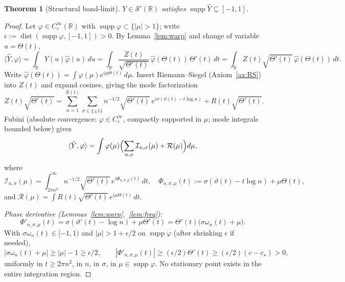 \documentclass[11pt]{article}
\newtheorem{theorem}{Theorem}
\theoremstyle{definition}
\newcommand{\R}{\mathbb{R}}
\newcommand{\supp}{\operatorname{supp}}
\begin{document}
\begin{theorem}[Structural band-limit]\label{thm:bandlimit}
\(Y\in\mathcal S'(\R)\) satisfies \(\supp\hat Y\subseteq[-1,1]\).
\end{theorem}

\begin{proof}
Let \(\varphi\in C_c^\infty(\R)\) with \(\supp\varphi\subset\{|\mu|>1\}\); write \(\epsilon:=\operatorname{dist}(\supp\varphi,[-1,1])>0\). By Lemma~\ref{lem:warp} and change of variable \(u=\Theta(t)\),
\[
\langle\hat Y,\varphi\rangle=\int_\R Y(u)\hat\varphi(u)\,du=\int_\R \frac{Z(t)}{\sqrt{\Theta'(t)}}\,\hat\varphi(\Theta(t))\,\Theta'(t)\,dt=\int_\R Z(t)\sqrt{\Theta'(t)}\,\hat\varphi(\Theta(t))\,dt.
\]
Write \(\hat\varphi(\Theta(t))=\int\varphi(\mu)e^{i\mu\Theta(t)}\,d\mu\). Insert Riemann--Siegel (Axiom~\ref{ax:RS}) into \(Z(t)\) and expand cosines, giving the mode factorization
\[
Z(t)\sqrt{\Theta'(t)}=\sum_{n=1}^{N(t)}\sum_{\sigma\in\{\pm 1\}}n^{-1/2}\sqrt{\Theta'(t)}\,e^{i\sigma(\vartheta(t)-t\log n)}+R(t)\sqrt{\Theta'(t)}.
\]
Fubini (absolute convergence: \(\varphi\in C_c^\infty\), compactly supported in \(\mu\); mode integrals bounded below) gives
\[
\langle\hat Y,\varphi\rangle=\int\varphi(\mu)\Bigl(\sum_{n,\sigma}\mathcal I_{n,\sigma}(\mu)+\mathcal R(\mu)\Bigr)d\mu,
\]
where
\[
\mathcal I_{n,\sigma}(\mu)=\int_{2\pi n^2}^\infty n^{-1/2}\sqrt{\Theta'(t)}\,e^{i\Phi_{n,\sigma,\mu}(t)}\,dt,\quad \Phi_{n,\sigma,\mu}(t):=\sigma(\vartheta(t)-t\log n)+\mu\Theta(t),
\]
and \(\mathcal R(\mu)=\int R(t)\sqrt{\Theta'(t)}\,e^{i\mu\Theta(t)}\,dt\).

\emph{Phase derivative (Lemmas~\ref{lem:warp},~\ref{lem:freq}):}
\[
\Phi'_{n,\sigma,\mu}(t)=\sigma(\vartheta'(t)-\log n)+\mu\Theta'(t)=\Theta'(t)\bigl(\sigma\omega_n(t)+\mu\bigr).
\]
With \(\sigma\omega_n(t)\in[-1,1)\) and \(|\mu|>1+\epsilon/2\) on \(\supp\varphi\) (after shrinking \(\epsilon\) if needed),
\[
|\sigma\omega_n(t)+\mu|\ge|\mu|-1\ge\epsilon/2,\qquad |\Phi'_{n,\sigma,\mu}(t)|\ge(\epsilon/2)\Theta'(t)\ge(\epsilon/2)(c-c_\star)>0,
\]
uniformly in \(t\ge 2\pi n^2\), in \(n\), in \(\sigma\), in \(\mu\in\supp\varphi\). No stationary point exists in the entire integration region.


\end{proof}
\end{document}
